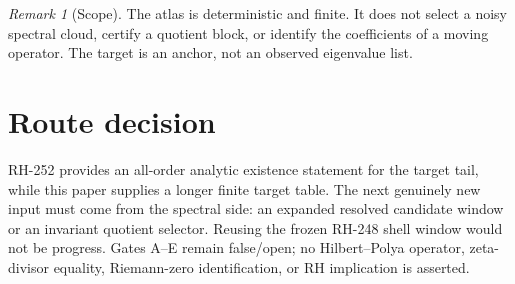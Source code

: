 \documentclass[11pt]{article}
\theoremstyle{remark}
\newtheorem{remark}[theorem]{Remark}
\begin{document}
\begin{remark}[Scope]
The atlas is deterministic and finite.  It does not select a noisy spectral
cloud, certify a quotient block, or identify the coefficients of a moving
operator.  The target is an anchor, not an observed eigenvalue list.
\end{remark}

\section{Route decision}

RH-252 provides an all-order analytic existence statement for the target tail,
while this paper supplies a longer finite target table.  The next genuinely
new input must come from the spectral side: an expanded resolved candidate
window or an invariant quotient selector.  Reusing the frozen RH-248 shell
window would not be progress.  Gates A--E remain false/open; no
Hilbert--Polya operator, zeta-divisor equality, Riemann-zero identification,
or RH implication is asserted.



\end{document}
